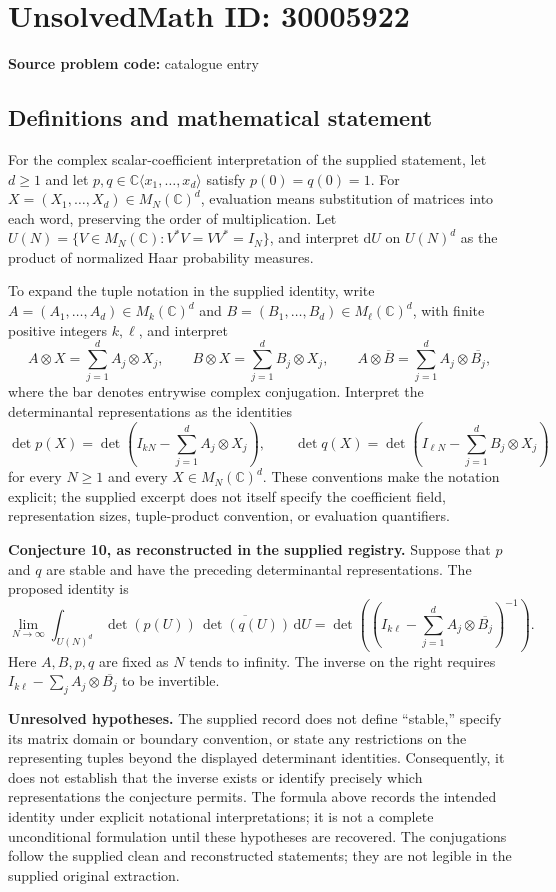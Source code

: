 \documentclass[11pt]{article}
\newcommand{\C}{\mathbb{C}}
\begin{document}
\section*{UnsolvedMath ID: 30005922}
\textbf{Source problem code:} catalogue entry
\subsection{Definitions and mathematical statement}
For the complex scalar-coefficient interpretation of the supplied statement, let \(d\geq 1\) and let \(p,q\in\C\langle x_1,\ldots,x_d\rangle\) satisfy \(p(0)=q(0)=1\). For \(X=(X_1,\ldots,X_d)\in M_N(\C)^d\), evaluation means substitution of matrices into each word, preserving the order of multiplication. Let \(U(N)=\{V\in M_N(\C):V^*V=VV^*=I_N\}\), and interpret \(\mathrm dU\) on \(U(N)^d\) as the product of normalized Haar probability measures.

To expand the tuple notation in the supplied identity, write \(A=(A_1,\ldots,A_d)\in M_k(\C)^d\) and \(B=(B_1,\ldots,B_d)\in M_\ell(\C)^d\), with finite positive integers \(k,\ell\), and interpret
\[
 A\otimes X=\sum_{j=1}^d A_j\otimes X_j,
 \qquad
 B\otimes X=\sum_{j=1}^d B_j\otimes X_j,
 \qquad
 A\otimes\overline B=\sum_{j=1}^d A_j\otimes\overline{B_j},
\]
where the bar denotes entrywise complex conjugation. Interpret the determinantal representations as the identities
\[
 \det p(X)=\det\!\left(I_{kN}-\sum_{j=1}^d A_j\otimes X_j\right),
 \qquad
 \det q(X)=\det\!\left(I_{\ell N}-\sum_{j=1}^d B_j\otimes X_j\right)
\]
for every \(N\geq1\) and every \(X\in M_N(\C)^d\). These conventions make the notation explicit; the supplied excerpt does not itself specify the coefficient field, representation sizes, tuple-product convention, or evaluation quantifiers.

\textbf{Conjecture 10, as reconstructed in the supplied registry.} Suppose that \(p\) and \(q\) are stable and have the preceding determinantal representations. The proposed identity is
\[
 \lim_{N\to\infty}
 \int_{U(N)^d}
       \det(p(U))\,\overline{\det(q(U))}\,\mathrm dU
 =
 \det\!\left(
       \left(I_{k\ell}-\sum_{j=1}^d A_j\otimes\overline{B_j}\right)^{-1}
       \right).
\]
Here \(A,B,p,q\) are fixed as \(N\) tends to infinity. The inverse on the right requires \(I_{k\ell}-\sum_j A_j\otimes\overline{B_j}\) to be invertible.

\textbf{Unresolved hypotheses.} The supplied record does not define ``stable,'' specify its matrix domain or boundary convention, or state any restrictions on the representing tuples beyond the displayed determinant identities. Consequently, it does not establish that the inverse exists or identify precisely which representations the conjecture permits. The formula above records the intended identity under explicit notational interpretations; it is not a complete unconditional formulation until these hypotheses are recovered. The conjugations follow the supplied clean and reconstructed statements; they are not legible in the supplied original extraction.
\end{document}
